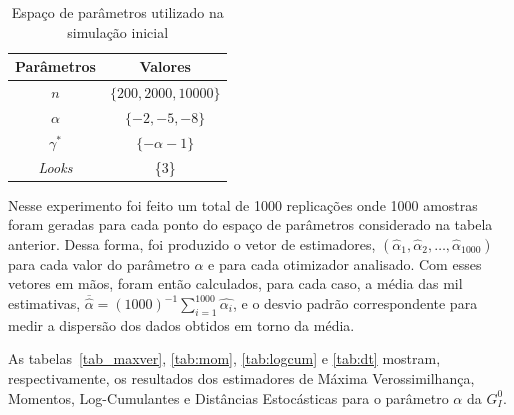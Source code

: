 \begin{table}[H]
\centering
\caption{Espaço de parâmetros utilizado na simulação inicial}
\label{tab:tabela_parameters}
\begin{tabular}{c|c}
\toprule 
\multicolumn{1}{c|}{Parâmetros} & \multicolumn{1}{c}{Valores}  \\ 
\midrule
\rowcolor[gray]{.9} 
$n$ & $\{200, 2000, 10000\}$ \\ \hline
$\alpha$ & $\{-2, -5, -8\}$ \\ \hline
\rowcolor[gray]{.9} $\gamma^{*}$ & $\{-\alpha - 1\}$ \\ \hline
\textit{Looks} & \{3\} \\ 
\bottomrule
\end{tabular}
\end{table}

Nesse experimento foi feito um total de 1000 replicações onde 1000 amostras foram geradas para cada ponto do espaço de parâmetros considerado na tabela anterior. Dessa forma, foi produzido o vetor de estimadores, $(\widehat{\alpha}_{1}, \widehat{\alpha}_{2}, \dots, \widehat{\alpha}_{1000})$ para cada valor do parâmetro $\alpha$ e para cada otimizador analisado. Com esses vetores em mãos, foram então calculados, para cada caso, a média das mil estimativas, $ \overline{\widehat{\alpha}} = (1000)^{-1} \sum_{i=1}^{1000} \widehat{\alpha_{i}} $, e o desvio padrão correspondente para medir a dispersão dos dados obtidos em torno da média. 

As tabelas~\ref{tab_maxver}, \ref{tab:mom}, \ref{tab:logcum} e \ref{tab:dt} mostram, respectivamente, os resultados dos estimadores de Máxima Verossimilhança, Momentos, Log-Cumulantes e Distâncias Estocásticas para o parâmetro $\alpha$ da $G_I^0$.

